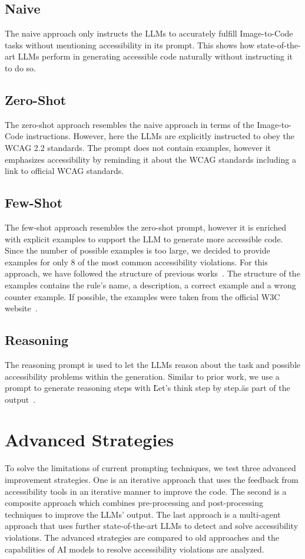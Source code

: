 \subsection{Naive}
The naive approach only instructs the LLMs to accurately fulfill Image-to-Code tasks
without mentioning accessibility in its prompt. This shows how state-of-the-art 
LLMs perform in generating accessible code naturally without instructing it to 
do so.

\subsection{Zero-Shot}
The zero-shot approach resembles the naive approach in terms of the Image-to-Code
instructions. However, here the LLMs are explicitly instructed to obey the WCAG 
2.2 standards. The prompt does not contain examples, however it emphasizes 
accessibility by reminding it about the WCAG standards including a link to 
official WCAG standards.

\subsection{Few-Shot}
The few-shot approach resembles the zero-shot prompt, however it is enriched with 
explicit examples to support the LLM to generate more accessible code. 
Since the number of possible examples is too large, we decided to provide examples 
for only 8 of the most common accessibility violations. 
For this approach, we have followed the structure of previous 
works~\parencite{suh2025accessiblecode}.
The structure of the examples contains the rule's name, a description, a
correct example and a wrong counter example. If possible, the examples 
were taken from the official W3C website~\parencite{wcag22}.

\subsection{Reasoning}
The reasoning prompt is used to let the LLMs reason about the task and possible 
accessibility problems within the generation. Similar to prior work, we use 
a prompt to generate reasoning steps with \"Let’s think step by 
step.\" as part of the output~\parencite{chae2024thinkexecute}.



\section{Advanced Strategies}
To solve the limitations of current prompting techniques, we test three 
advanced improvement strategies. One is an iterative approach that uses the 
feedback from accessibility tools in an iterative manner to improve the code.
The second is a composite approach which combines 
pre-processing and post-processing techniques to improve the LLMs' output.
The last approach is a multi-agent approach that uses further 
state-of-the-art LLMs to detect and solve accessibility violations. \newline
The advanced strategies are compared to old approaches and the capabilities 
of AI models to resolve accessibility violations are analyzed.

